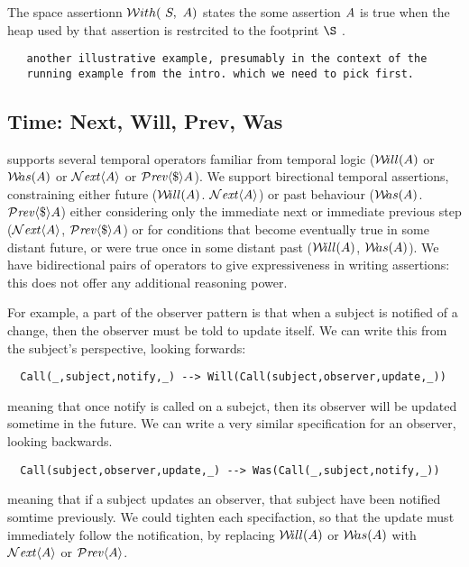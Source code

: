 The space assertionn ${\mathcal W}ith(\ S,\ A)$ states the some assertion $A$ is
true when the heap used by that assertion is restrcited to the
footprint $\S$  .


\begin{lstlisting}
   another illustrative example, presumably in the context of the
   running example from the intro. which we need to pick first.
\end{lstlisting}


\subsection{Time: Next, Will, Prev, Was}

\Chainmail supports several temporal operators familiar from temporal
logic (${{\mathcal W}\!ill}(A)$ or ${{\mathcal W}\!as}(A)$ or ${\mathcal{N}}\textrm{\textit{ext}}\langle A\rangle$ or ${\mathcal{P}}\textrm{\textit{rev}}\langle \$\rangle A$). 
We support birectional temporal
assertions, constraining either future (${{\mathcal W}\!ill}(A)$. ${\mathcal{N}}\textrm{\textit{ext}}\langle A\rangle$)
or past behaviour (${{\mathcal W}\!as}(A)$.  ${\mathcal{P}}\textrm{\textit{rev}}\langle \$\rangle A$) either considering only
the  immediate next or immediate previous step (${\mathcal{N}}\textrm{\textit{ext}}\langle A\rangle$,
${\mathcal{P}}\textrm{\textit{rev}}\langle \$\rangle A$) or for conditions that become eventually true in some
distant future, or were true once in some distant past  
(${{\mathcal W}\!ill}(A)$, ${{\mathcal W}\!as}(A)$). We have bidirectional pairs of operators
to give expressiveness in writing assertions: this does not offer any
additional reasoning power. 

For example, a part of the observer pattern is that when
a subject is notified of a change, then the observer must
be told to update itself.    We can write this from the
subject's perspective, looking forwards:

\begin{lstlisting}
  Call(_,subject,notify,_) --> Will(Call(subject,observer,update,_))
\end{lstlisting}

\noindent meaning that once notify is called on a subejct, then its
observer will be updated sometime in the future.  We can write a very
similar specification for an observer, looking backwards.

\begin{lstlisting}
  Call(subject,observer,update,_) --> Was(Call(_,subject,notify,_))
\end{lstlisting}

\noindent meaning that if a subject updates an observer, that subject
have been notified somtime previously. We could tighten each
specifaction, so that the update must immediately follow the
notification, by replacing ${{\mathcal W}\!ill}(A)$ or ${{\mathcal W}\!as}(A)$ with 
${\mathcal{N}}\textrm{\textit{ext}}\langle A\rangle$ or ${\mathcal{P}}\textrm{\textit{rev}}\langle A\rangle$.

